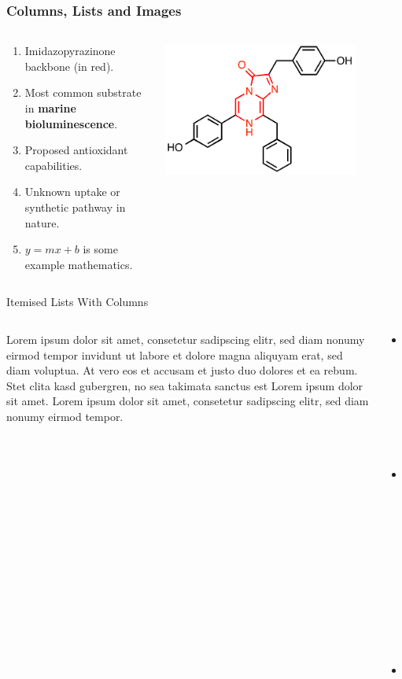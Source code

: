 \documentclass[aspectratio=1610]{beamer}
\begin{document}
\begin{frame}
   \frametitle{Columns, Lists and Images}
   \begin{columns}
      \begin{column}{0.5\textwidth}
         \begin{enumerate}
            \item Imidazopyrazinone backbone (in red).
            \item Most common substrate in \textbf{marine bioluminescence}.
            \item Proposed antioxidant capabilities.
            \item Unknown uptake or synthetic pathway in nature.
            \item $y=mx+b$ is some example mathematics.
         \end{enumerate}
      \end{column}
      \begin{column}{0.5\textwidth}
         \centering
         \includegraphics[width=0.8\textwidth]{coelenterazine.png}
      \end{column}
   \end{columns}
\end{frame}


\begin{frame}{Itemised Lists With Columns}
   \begin{columns}[T]
      \begin{column}{0.48\textwidth}
      Lorem ipsum dolor sit amet, consetetur sadipscing elitr, sed diam nonumy eirmod tempor invidunt ut labore et dolore magna aliquyam erat, sed diam voluptua. At vero eos et accusam et justo duo dolores et ea rebum. Stet clita kasd gubergren, no sea takimata sanctus est Lorem ipsum dolor sit amet. Lorem ipsum dolor sit amet, consetetur sadipscing elitr, sed diam nonumy eirmod tempor.
      \end{column}
      \begin{column}{0.48\textwidth}
      \begin{itemize}
         \item One point
         \item Another point
         \item And a \alert{third}!
      \end{itemize}
      \end{column}
   \end{columns}
\end{frame}
\end{document}
